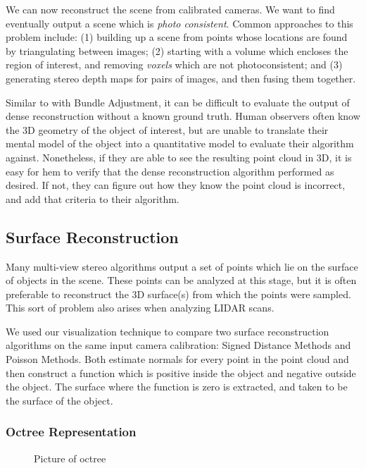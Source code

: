 \documentclass[10pt,twocolumn,letterpaper]{article}
\begin{document}
We can now reconstruct the scene from calibrated cameras. We want to find eventually output a scene which is \emph{photo consistent}. Common approaches to this problem include: (1) building up a scene from points whose locations are found by triangulating between images; (2) starting with a volume which encloses the region of interest, and removing \emph{voxels} which are not photoconsistent; and (3) generating stereo depth maps for pairs of images, and then fusing them together.\cite{furukawa}

Similar to with Bundle Adjustment, it can be difficult to evaluate the output of dense reconstruction without a known ground truth. Human observers often know the 3D geometry of the object of interest, but are unable to translate their mental model of the object into a quantitative model to evaluate their algorithm against. Nonetheless, if they are able to see the resulting point cloud in 3D, it is easy for hem to verify that the dense reconstruction algorithm performed as desired. If not, they can figure out how they know the point cloud is incorrect, and add that criteria to their algorithm.

\subsection{Surface Reconstruction}
Many multi-view stereo algorithms output a set of points which lie on the surface of objects in the scene. These points can be analyzed at this stage, but it is often preferable to reconstruct the 3D surface(s) from which the points were sampled. This sort of problem also arises when analyzing LIDAR scans.

We used our visualization technique to compare two surface reconstruction algorithms on the same input camera calibration: Signed Distance Methods and Poisson Methods.\cite{hoppe1992surface, poisson} Both estimate normals for every point in the point cloud and then construct a function which is positive inside the object and negative outside the object. The surface where the function is zero is extracted, and taken to be the surface of the object.


\subsubsection{Octree Representation}

\begin{figure}[t]
  \begin{center}
    \fbox{\rule{0pt}{2in} \rule{0.9\linewidth}{0pt}}
  \end{center}
  \caption{Picture of octree}
\end{figure}
\end{document}
